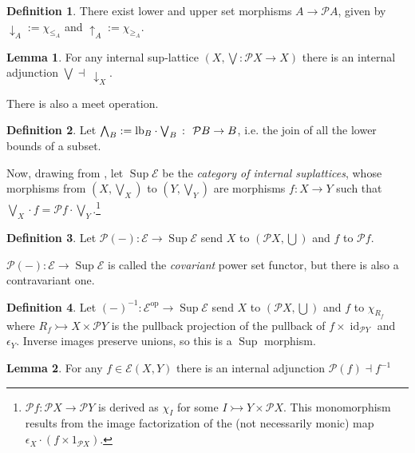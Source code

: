\documentclass{article}
\theoremstyle{definition}
\newtheorem{definition}{Definition}[section]
\newtheorem{lemma}{Lemma}[section]
\newcommand{\cE}{\mathcal{E}}
\newcommand{\cP}{\mathcal{P}}
\newcommand{\op}{\operatorname{op}}
\newcommand{\id}{\operatorname{id}}
\newcommand{\Sup}{\operatorname{Sup}}
\begin{document}
\begin{definition}
    \label{def:lowerset}
    There exist lower and upper set morphisms $A\to\cP A$, given by ${\downarrow_A}:=\chi_{\le_A}$ and ${\uparrow_A}:=\chi_{\ge_A}$. 
\end{definition}

\begin{lemma}
    \label{lemma:adjveedown}
    For any internal sup-lattice $(X,\bigvee\colon \cP X \to X)$ there is an internal adjunction $\bigvee \dashv\ \downarrow_X$.
\end{lemma}

There is also a meet operation.

\begin{definition}
    Let $\bigwedge_B:={\rm lb}_B\cdot\bigvee_B\ \colon\ \cP B\to B$, i.e. the join of all the lower bounds of a subset.
\end{definition}

Now, drawing from \cite[Sec I]{joyal1984extension}, let $\Sup \cE$ be the {\it category of internal suplattices}, whose morphisms from ${(X,\bigvee_X)}$ to ${(Y,\bigvee_Y)}$ are morphisms $f\colon X\to Y$ such that $\bigvee_X\cdot f=\cP f \cdot \bigvee_Y$.\footnote{$\cP f\colon \cP X\to \cP Y$ is derived as $\chi_{I}$ for some $I \rightarrowtail Y\times \cP X$. This monomorphism results from the image factorization of the (not necessarily monic) map $\epsilon_X\cdot (f\times 1_{\cP X})$.}

\begin{definition}
    Let $\cP(-)\colon\cE\to\Sup\cE$ send $X$ to $(\cP X,\bigcup)$ and $f$ to $\cP f$.
\end{definition}


$\cP(-)\colon\cE\to\Sup\cE$ is called the {\it covariant} power set functor, but there is also a contravariant one.

\begin{definition}
    Let $(-)^{-1}\colon \cE^{\op}\to\Sup\cE$ send $X$ to $(\cP X,\bigcup)$ and $f$ to $\chi_{R_f}$ where $R_f\rightarrowtail X\times \cP Y$ is the pullback projection of the pullback of $f\times \id_{\cP Y}$ and $\epsilon_Y$. Inverse images preserve unions, so this is a $\Sup$ morphism.
\end{definition}

\begin{lemma}
    \label{lemma:imadj}
    For any $f \in \cE(X,Y)$ there is an internal adjunction $\cP(f)\dashv f^{-1}$ 
\end{lemma}
\end{document}
